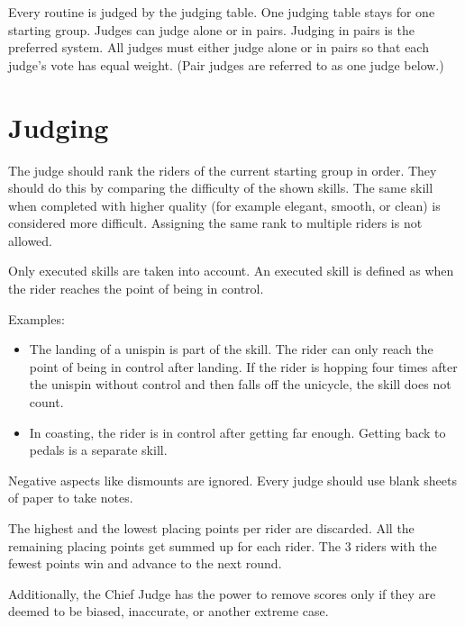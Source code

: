 Every routine is judged by the judging table.
One judging table stays for one starting group.
Judges can judge alone or in pairs.
Judging in pairs is the preferred system.
All judges must either judge alone or in pairs so that each judge's vote has equal weight.
(Pair judges are referred to as one judge below.)

\section{Judging}

The judge should rank the riders of the current starting group in order.
They should do this by comparing the difficulty of the shown skills.
The same skill when completed with higher quality (for example elegant, smooth, or clean) is considered more difficult.
Assigning the same rank to multiple riders is not allowed.

Only executed skills are taken into account.
An executed skill is defined as when the rider reaches the point of being in control.

Examples:
\begin{itemize}
\item The landing of a unispin is part of the skill.
The rider can only reach the point of being in control after landing.
If the rider is hopping four times after the unispin without control and then falls off the unicycle, the skill does not count.
\item In coasting, the rider is in control after getting far enough.
Getting back to pedals is a separate skill.
\end{itemize}

Negative aspects like dismounts are ignored.
Every judge should use blank sheets of paper to take notes.

The highest and the lowest placing points per rider are discarded.
All the remaining placing points get summed up for each rider.
The 3 riders with the fewest points win and advance to the next round.

Additionally, the Chief Judge has the power to remove scores only if they are deemed to be biased, inaccurate, or another extreme case.
